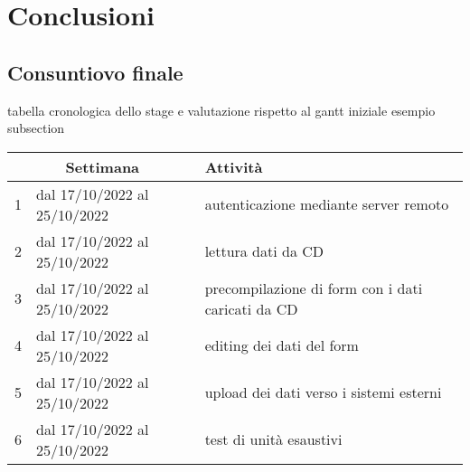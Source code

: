 
\chapter{Conclusioni}
\label{cap:conclusioni}
\section{Consuntiovo finale}
\label{sec:consuntivo-finale}
tabella cronologica dello stage
e valutazione rispetto al gantt iniziale
esempio subsection

\begin{center}
  \renewcommand{\arraystretch}{1.8} %
  \begin{tabular}{ |p{1cm}|p{}|p{}| }
    \hline
    \multicolumn{2}{|c|}{\textbf{Settimana}} & \textbf{Attività}                                                                                                  \\
    \hline
    1                                        & dal 17/10/2022 al 25/10/2022 & autenticazione mediante server remoto                                               \\
    \hline
    2                                        & dal 17/10/2022 al 25/10/2022 & lettura dati da CD                                                                  \\
    \hline
    3                                        & dal 17/10/2022 al 25/10/2022 & precompilazione di form con i dati caricati da CD                                   \\
    \hline
    4                                        & dal 17/10/2022 al 25/10/2022 & editing dei dati del form                                                           \\
    \hline
    5                                        & dal 17/10/2022 al 25/10/2022 & upload dei dati verso i sistemi esterni                                             \\
    \hline
    6                                        & dal 17/10/2022 al 25/10/2022 & test di unità esaustivi                                                             \\

\end{tabular}
\end{center}
